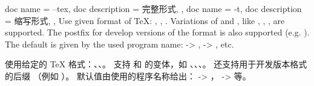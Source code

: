 \begin{docKeys}[
  doc no index,   %
  doc parameter = {~\meta{format}},
]
{
  {
    doc name        = --tex,
    doc description = 完整形式,
  },
  {
    doc name        = -t,
    doc description = 缩写形式,
  },
}
Use given format of TeX: , , .
Variations of  and , like , , ,  are supported.
The postfix  for develop versions of the format is also supported (e.g. ).
The default is given by the used program name:  -> ,  -> , etc.

%
使用给定的 TeX 格式：、、。 支持  和  的变体，如 、、、。 还支持用于开发版本格式的后缀 （例如 ）。 默认值由使用的程序名称给出： -> ， ->  等。
\end{docKeys}


